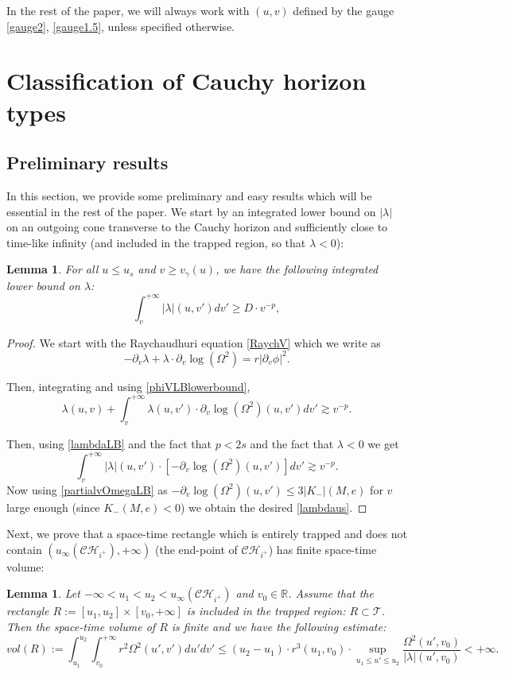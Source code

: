 \documentclass[10pt,a4paper]{article}
\theoremstyle{plain}
\newtheorem{lem}[thm]{Lemma}
\theoremstyle{remark}
\theoremstyle{definition}
\newcommand{\RR}{\mathbb{R}}
\theoremstyle{plain}
\theoremstyle{remark}
\theoremstyle{definition}
\newcommand{\CH}{\mathcal{CH}_{i^+}}
\numberwithin{equation}{section}
\begin{document}
In the rest of the paper, we will always work with $(u,v)$ defined by the gauge \eqref{gauge2}, \eqref{gauge1.5}, unless specified otherwise.

\section{Classification of Cauchy horizon types} 
\subsection{Preliminary results} \label{lowerboundslambdasection}

In this section, we provide some preliminary and easy results which will be essential in the rest of the paper. We start by an integrated lower bound on $|\lambda|$ on an outgoing cone transverse to the Cauchy horizon and sufficiently close to time-like infinity (and included in the trapped region, so that $\lambda<0$):
\begin{lem} For all $u \leq u_s$ and $v \geq v_{\gamma}(u)$, we have the following integrated lower bound on $\lambda$:
	\begin{equation} \label{lambdaus}
	\int_{v}^{+\infty} |\lambda|(u,v') dv' \geq  D \cdot v^{-p},
	\end{equation} 
\end{lem}

\begin{proof}
	We start with the Raychaudhuri equation \eqref{RaychV} which we write as $$ -\partial_v \lambda  +\lambda \cdot \partial_v \log(\Omega^2)= r |\partial_v \phi|^2.$$
	
	Then, integrating and using \eqref{phiVLBlowerbound}, $$ \lambda(u,v)+ \int_{v}^{+\infty}\lambda(u,v') \cdot \partial_v \log(\Omega^2)(u,v') dv' \gtrsim v^{-p}.$$
	
Then, using \eqref{lambdaLB} and the fact that $p<2s$ and the fact that $\lambda<0$ we get  $$  \int_{v}^{+\infty}|\lambda|(u,v') \cdot [-\partial_v \log(\Omega^2)(u,v') ]dv' \gtrsim v^{-p}.$$ Now using \eqref{partialvOmegaLB} as $-\partial_v \log(\Omega^2)(u,v') \leq 3 |K_-|(M,e)$ for $v$ large enough  (since $K_-(M,e)<0$) we obtain the desired \eqref{lambdaus}. \color{black}%
\end{proof}
Next, we prove that a space-time rectangle which is entirely trapped and does not contain $(u_{\infty}(\CH),+\infty)$ (the end-point of $\CH$) has finite space-time volume:
\begin{lem} \label{trappedvolume}
	Let $-\infty < u_1 <u_2 < u_{\infty}(\CH)$ and $v_0 \in \RR$. Assume that the rectangle $R:=[u_1,u_2] \times [v_0,+\infty]$ is included in the trapped region: $R \subset \mathcal{T}$. Then the space-time volume of $R$ is finite and we have the following estimate: $$ vol(R):=  \int_{u_1}^{u_2} \int_{v_0}^{+\infty} r^2 \Omega^2(u',v') du' dv' \leq (u_2-u_1) \cdot r^3(u_1,v_0) \cdot \sup_{u_1 \leq u' \leq u_2} \frac{\Omega^2(u',v_0)}{|\lambda|(u',v_0)}  <+\infty.$$
	
\end{lem}
\end{document}
